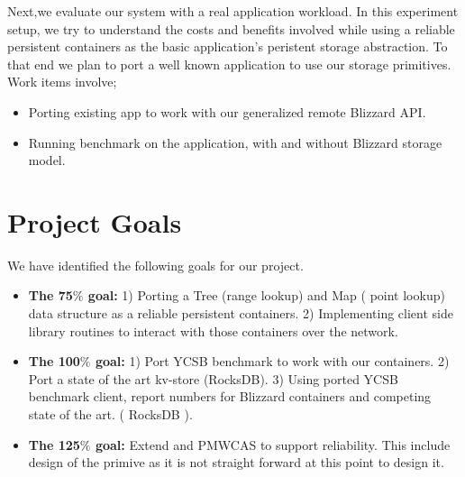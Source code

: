 Next,we evaluate our system with a real application workload. In this experiment setup, we try to understand the costs
and benefits involved while using a reliable persistent containers as the basic application's peristent storage abstraction.
To that end we plan to port a well known application to use our storage primitives. Work items involve;
\begin{itemize}
\item Porting existing app to work with our generalized remote Blizzard API.
\item Running benchmark on the application, with and without Blizzard storage model.
\end{itemize}


\section{Project Goals}
We have identified the following goals for our project.
\begin{itemize}
	\item {\bf The 75$\%$ goal:} 1) Porting a Tree (range lookup) and Map ( point lookup) data structure as a reliable persistent containers. 2) Implementing
			client side library routines to interact with those containers over the network. 

		\item {\bf The 100$\%$ goal:} 1) Port YCSB benchmark to work with our containers. 2) Port a state of the art kv-store (RocksDB). 
				3) Using ported YCSB benchmark client, report numbers for Blizzard containers and competing state of the art. ( RocksDB ).

\item {\bf The 125$\%$ goal:} Extend and PMWCAS to support reliability. This include design of the primive as it is not straight forward at this
		point to design it.
\end{itemize}

